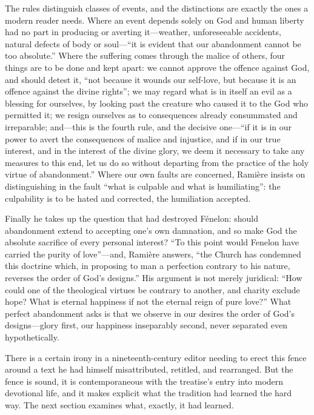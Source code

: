 The rules distinguish classes of events, and the distinctions are exactly the ones a modern reader needs. Where an event depends solely on God and human liberty had no part in producing or averting it---weather, unforeseeable accidents, natural defects of body or soul---``it is evident that our abandonment cannot be too absolute.'' Where the suffering comes through the malice of others, four things are to be done and kept apart: we cannot approve the offence against God, and should detest it, ``not because it wounds our self-love, but because it is an offence against the divine rights''; we may regard what is in itself an evil as a blessing for ourselves, by looking past the creature who caused it to the God who permitted it; we resign ourselves as to consequences already consummated and irreparable; and---this is the fourth rule, and the decisive one---``if it is in our power to avert the consequences of malice and injustice, and if in our true interest, and in the interest of the divine glory, we deem it necessary to take any measures to this end, let us do so without departing from the practice of the holy virtue of abandonment.'' Where our own faults are concerned, Ramière insists on distinguishing in the fault ``what is culpable and what is humiliating'': the culpability is to be hated and corrected, the humiliation accepted.

Finally he takes up the question that had destroyed Fénelon: should abandonment extend to accepting one's own damnation, and so make God the absolute sacrifice of every personal interest? ``To this point would Fenelon have carried the purity of love''---and, Ramière answers, ``the Church has condemned this doctrine which, in proposing to man a perfection contrary to his nature, reverses the order of God's designs.'' His argument is not merely juridical: ``How could one of the theological virtues be contrary to another, and charity exclude hope? What is eternal happiness if not the eternal reign of pure love?'' What perfect abandonment asks is that we observe in our desires the order of God's designs---glory first, our happiness inseparably second, never separated even hypothetically.

There is a certain irony in a nineteenth-century editor needing to erect this fence around a text he had himself misattributed, retitled, and rearranged. But the fence is sound, it is contemporaneous with the treatise's entry into modern devotional life, and it makes explicit what the tradition had learned the hard way. The next section examines what, exactly, it had learned.
